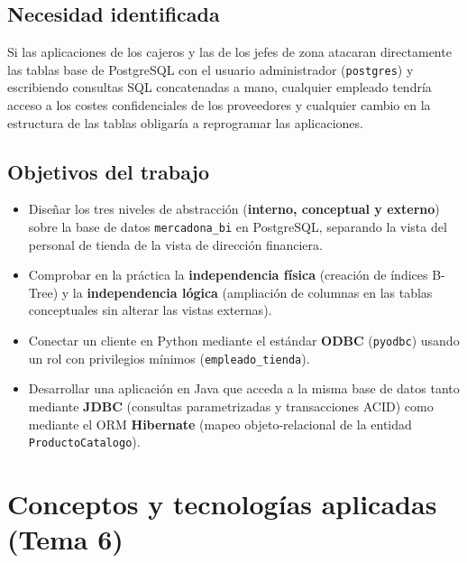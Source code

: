 \documentclass[a4paper,12pt]{article}
\begin{document}
\subsection{Necesidad identificada}
Si las aplicaciones de los cajeros y las de los jefes de zona atacaran directamente las tablas base de PostgreSQL con el usuario administrador (\texttt{postgres}) y escribiendo consultas SQL concatenadas a mano, cualquier empleado tendría acceso a los costes confidenciales de los proveedores y cualquier cambio en la estructura de las tablas obligaría a reprogramar las aplicaciones.

\subsection{Objetivos del trabajo}
\begin{itemize}[leftmargin=1.0cm]
  \item Diseñar los tres niveles de abstracción (\textbf{interno, conceptual y externo}) sobre la base de datos \texttt{mercadona\_bi} en PostgreSQL, separando la vista del personal de tienda de la vista de dirección financiera.
  \item Comprobar en la práctica la \textbf{independencia física} (creación de índices B-Tree) y la \textbf{independencia lógica} (ampliación de columnas en las tablas conceptuales sin alterar las vistas externas).
  \item Conectar un cliente en Python mediante el estándar \textbf{ODBC} (\texttt{pyodbc}) usando un rol con privilegios mínimos (\texttt{empleado\_tienda}).
  \item Desarrollar una aplicación en Java que acceda a la misma base de datos tanto mediante \textbf{JDBC} (consultas parametrizadas y transacciones ACID) como mediante el ORM \textbf{Hibernate} (mapeo objeto-relacional de la entidad \texttt{ProductoCatalogo}).
\end{itemize}

\section{Conceptos y tecnologías aplicadas (Tema 6)}
\end{document}
